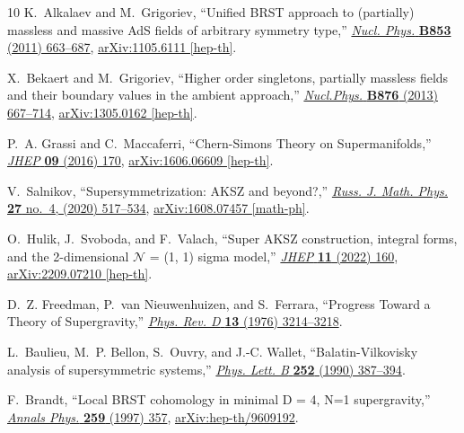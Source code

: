 \documentclass[a4paper,12pt]{article}
\numberwithin{equation}{section} %
\numberwithin{equation}{section}
\begin{document}
\begin{thebibliography}{10}
K.~Alkalaev and M.~Grigoriev, ``{U}nified {BRST} approach to (partially) massless and massive {A}d{S} fields of arbitrary symmetry type,'' \href{http://dx.doi.org/10.1016/j.nuclphysb.2011.08.005}{{\em Nucl. Phys.} {\bfseries B853} (2011) 663--687},
\href{http://arxiv.org/abs/1105.6111}{{\ttfamily arXiv:1105.6111 [hep-th]}}.

X.~Bekaert and M.~Grigoriev, ``{H}igher order singletons, partially massless fields and their boundary values in the ambient approach,'' \href{http://dx.doi.org/10.1016/j.nuclphysb.2013.08.015}{{\em Nucl.Phys.} {\bfseries B876} (2013) 667--714},
\href{http://arxiv.org/abs/1305.0162}{{\ttfamily arXiv:1305.0162 [hep-th]}}.

P.~A. Grassi and C.~Maccaferri, ``{Chern-Simons Theory on Supermanifolds},'' \href{http://dx.doi.org/10.1007/JHEP09(2016)170}{{\em JHEP} {\bfseries 09} (2016) 170}, \href{http://arxiv.org/abs/1606.06609}{{\ttfamily arXiv:1606.06609 [hep-th]}}.

V.~Salnikov, ``{Supersymmetrization: AKSZ and beyond?},'' \href{http://dx.doi.org/10.1134/S1061920820040111}{{\em Russ. J. Math. Phys.} {\bfseries 27} no.~4, (2020) 517--534}, \href{http://arxiv.org/abs/1608.07457}{{\ttfamily arXiv:1608.07457 [math-ph]}}.

O.~Hulik, J.~Svoboda, and F.~Valach, ``{Super AKSZ construction, integral forms, and the 2-dimensional $ \mathcal{N} $ = (1, 1) sigma model},'' \href{http://dx.doi.org/10.1007/JHEP11(2022)160}{{\em JHEP} {\bfseries 11} (2022) 160}, \href{http://arxiv.org/abs/2209.07210}{{\ttfamily arXiv:2209.07210 [hep-th]}}.

D.~Z. Freedman, P.~van Nieuwenhuizen, and S.~Ferrara, ``{Progress Toward a Theory of Supergravity},'' \href{http://dx.doi.org/10.1103/PhysRevD.13.3214}{{\em Phys. Rev. D} {\bfseries 13} (1976) 3214--3218}.

L.~Baulieu, M.~P. Bellon, S.~Ouvry, and J.-C. Wallet, ``{Balatin-Vilkovisky analysis of supersymmetric systems},'' \href{http://dx.doi.org/10.1016/0370-2693(90)90557-M}{{\em Phys. Lett. B} {\bfseries 252} (1990) 387--394}.

F.~Brandt, ``{Local BRST cohomology in minimal D = 4, N=1 supergravity},'' \href{http://dx.doi.org/10.1006/aphy.1997.5709}{{\em Annals Phys.} {\bfseries 259} (1997) 357}, \href{http://arxiv.org/abs/hep-th/9609192}{{\ttfamily arXiv:hep-th/9609192}}.


\end{thebibliography}
\end{document}
